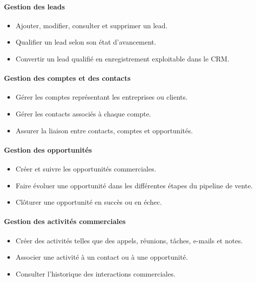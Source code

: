 \documentclass[12pt,a4paper]{report}
\begin{document}
\paragraph{Gestion des leads}
\begin{itemize}
    \item Ajouter, modifier, consulter et supprimer un lead.
    \item Qualifier un lead selon son état d’avancement.
    \item Convertir un lead qualifié en enregistrement exploitable dans le CRM.
\end{itemize}

\paragraph{Gestion des comptes et des contacts}
\begin{itemize}
    \item Gérer les comptes représentant les entreprises ou clients.
    \item Gérer les contacts associés à chaque compte.
    \item Assurer la liaison entre contacts, comptes et opportunités.
\end{itemize}

\paragraph{Gestion des opportunités}
\begin{itemize}
    \item Créer et suivre les opportunités commerciales.
    \item Faire évoluer une opportunité dans les différentes étapes du pipeline de vente.
    \item Clôturer une opportunité en succès ou en échec.
\end{itemize}

\paragraph{Gestion des activités commerciales}
\begin{itemize}
    \item Créer des activités telles que des appels, réunions, tâches, e-mails et notes.
    \item Associer une activité à un contact ou à une opportunité.
    \item Consulter l’historique des interactions commerciales.
\end{itemize}
\end{document}
